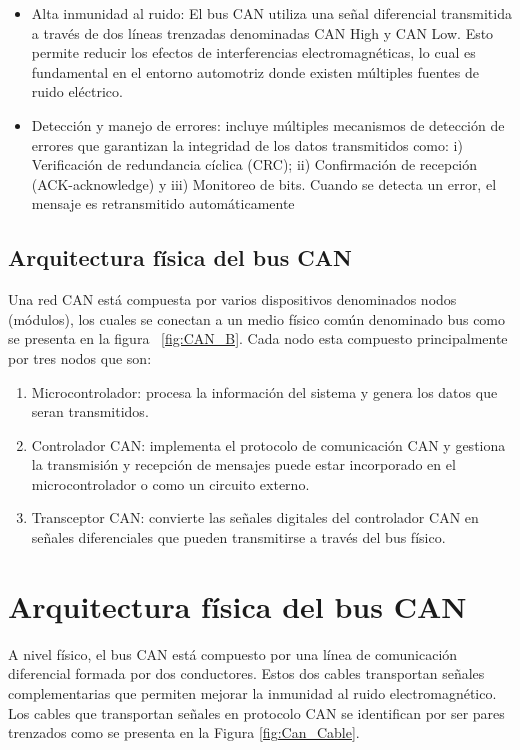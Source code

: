 \begin{itemize}
    \item Alta inmunidad al ruido: El bus CAN utiliza una señal diferencial transmitida a través de dos líneas trenzadas denominadas CAN High y CAN Low. Esto permite reducir los efectos de interferencias electromagnéticas, lo cual es fundamental en el entorno automotriz donde existen múltiples fuentes de ruido eléctrico.
    \item Detección y manejo de errores: incluye múltiples mecanismos de detección de errores que garantizan la integridad de los datos transmitidos como: i) Verificación de redundancia cíclica (CRC); ii) Confirmación de recepción (ACK-acknowledge) y iii) Monitoreo de bits. Cuando se detecta un error, el mensaje es retransmitido automáticamente 
    
\end{itemize}

\subsection{Arquitectura física del bus CAN}
Una red CAN está compuesta por varios dispositivos denominados nodos (módulos), los cuales se conectan a un medio físico común denominado bus como se presenta en la figura ~\ref{fig:CAN_B}. Cada nodo esta compuesto principalmente por tres nodos que son:
\begin{enumerate}
    \item Microcontrolador: procesa la información del sistema y genera los datos que seran transmitidos.
    \item Controlador CAN: implementa el protocolo de comunicación CAN y gestiona la transmisión y recepción de mensajes puede estar incorporado en el microcontrolador o como un circuito externo.
    \item Transceptor CAN: convierte las señales digitales del controlador CAN en señales diferenciales que pueden transmitirse a través del bus físico.
\end{enumerate}

\section{Arquitectura física del bus CAN}
A nivel físico, el bus CAN está compuesto por una línea de comunicación diferencial formada por dos conductores. Estos dos cables transportan señales complementarias que permiten mejorar la inmunidad al ruido electromagnético. Los cables que transportan señales en protocolo CAN se identifican por ser pares trenzados como se presenta en la Figura \ref{fig:Can_Cable}.

